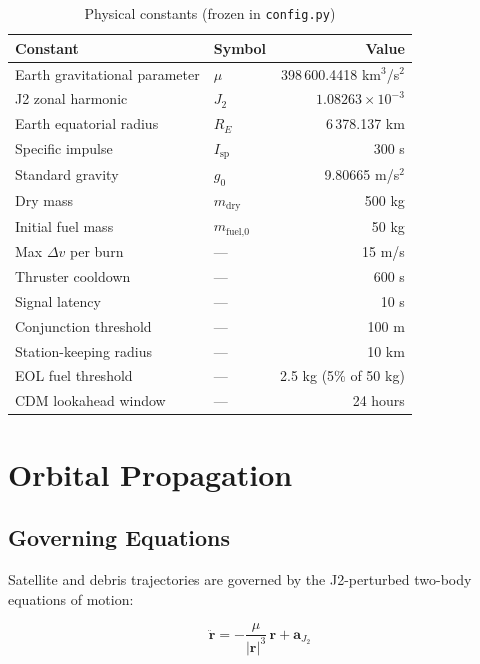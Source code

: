\documentclass[11pt,a4paper]{article}
\begin{document}
\begin{table}[H]
\centering
\caption{Physical constants (frozen in \texttt{config.py})}
\begin{tabular}{@{}llr@{}}
\toprule
\textbf{Constant} & \textbf{Symbol} & \textbf{Value} \\
\midrule
Earth gravitational parameter & $\mu$ & 398\,600.4418 km$^3$/s$^2$ \\
J2 zonal harmonic & $J_2$ & $1.08263 \times 10^{-3}$ \\
Earth equatorial radius & $R_E$ & 6\,378.137 km \\
Specific impulse & $I_\text{sp}$ & 300 s \\
Standard gravity & $g_0$ & 9.80665 m/s$^2$ \\
Dry mass & $m_\text{dry}$ & 500 kg \\
Initial fuel mass & $m_\text{fuel,0}$ & 50 kg \\
Max $\Delta v$ per burn & --- & 15 m/s \\
Thruster cooldown & --- & 600 s \\
Signal latency & --- & 10 s \\
Conjunction threshold & --- & 100 m \\
Station-keeping radius & --- & 10 km \\
EOL fuel threshold & --- & 2.5 kg (5\% of 50 kg) \\
CDM lookahead window & --- & 24 hours \\
\bottomrule
\end{tabular}
\end{table}

\section{Orbital Propagation}

\subsection{Governing Equations}

Satellite and debris trajectories are governed by the J2-perturbed two-body
equations of motion:

\begin{equation}
\ddot{\mathbf{r}} = -\frac{\mu}{|\mathbf{r}|^3}\,\mathbf{r} + \mathbf{a}_{J_2}
\end{equation}
\end{document}
